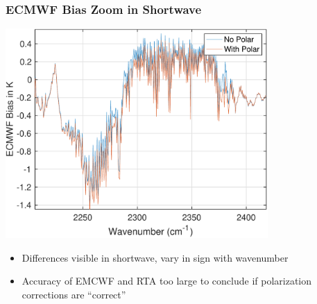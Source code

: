 \documentclass[10pt,t]{beamer} \usepackage[utf8]{inputenc}
\begin{document}
\begin{frame}
  \frametitle{ECMWF Bias Zoom in Shortwave}
  \vspace{-0.125in} %
  \begin{center}
    \noindent\includegraphics[width=0.75\textwidth]{Figs/bias_in_k_plon_ploff_with_minorg_corrs_sw_zoom.pdf}
  \end{center}
\vspace{-0.1in}
  \begin{itemize}
    \item Differences visible in shortwave, vary in sign with wavenumber
    \item Accuracy of EMCWF and RTA too large to conclude if polarization corrections are ``correct''
      \end{itemize}
\end{frame}
\end{document}
